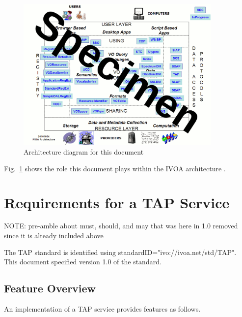 \documentclass[11pt,a4paper]{ivoa}
\begin{document}
\begin{figure}
\centering


\includegraphics[width=0.9\textwidth]{archdiag.png}
\caption{Architecture diagram for this document}
\label{fig:archdiag}
\end{figure}

Fig.~\ref{fig:archdiag} shows the role this document plays within the
IVOA architecture \citep{note:VOARCH}.



\section{Requirements for a TAP Service}

NOTE: pre-amble about must, should, and may that was here in 1.0 removed since 
it is alteady included above

The TAP standard is identified using standardID="ivo://ivoa.net/std/TAP". This 
document specified version 1.0 of the standard.

\subsection{Feature Overview}
An implementation of a TAP service provides features as follows.
\end{document}
